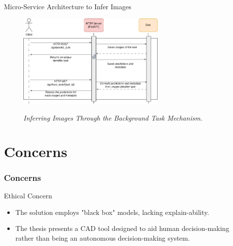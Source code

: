 \documentclass[dvipsnames,mathserif]{beamer}
\begin{document}
{\begin{frame}
    \end{frame}

    \begin{frame}
      \large Micro-Service Architecture to Infer Images
      \vspace{0.25cm}

      \begin{figure}[H]
        \centering
        \includegraphics[width=0.65\textwidth]{images/BackgroundTask.drawio.png}
        \caption[Inferring Images Through the Background Task Mechanism]{\textit{Inferring Images Through the Background Task Mechanism.  }}
        {\label{fig:backgrond-task}}
      \end{figure}

    \end{frame}





    \section{Concerns}


    \begin{frame}
      \frametitle{Concerns}
    \end{frame}

    \begin{frame}
      \large Ethical Concern
      \vspace{0.25cm}

      \footnotesize
      \begin{itemize}
        \item The solution employs "black box" models, lacking explain-ability.
        \item The thesis presents a CAD tool designed to aid human decision-making
          rather than being an autonomous decision-making system.
      \end{itemize}
    \end{frame}

}
\end{document}
